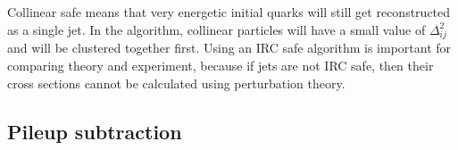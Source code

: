Collinear safe means that very energetic initial quarks will still get reconstructed as a single jet. In the \antikt algorithm, collinear particles will have a small value of $\Delta^2_{ij}$ and will be clustered together first. Using an IRC safe algorithm is important for comparing theory and experiment, because if jets are not IRC safe, then their cross sections cannot be calculated using perturbation theory.

\subsection{Pileup subtraction}
\label{}

